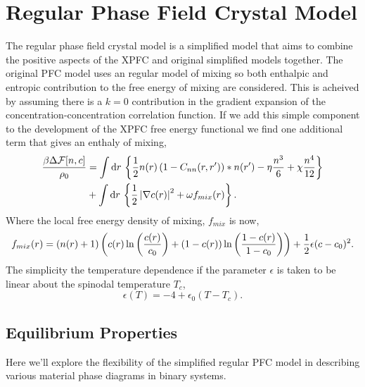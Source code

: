 \section{Regular Phase Field Crystal Model} %

The regular phase field crystal model is a simplified model that aims to combine 
the positive aspects of the XPFC and original simplified models together. The 
original PFC model uses an regular model of mixing so both enthalpic and entropic 
contribution to the free energy of mixing are considered. This is acheived by
assuming there is a $k=0$ contribution in the gradient expansion of the 
concentration-concentration correlation function. If we add this simple component
to the development of the XPFC free energy functional we find one additional term
that gives an enthaly of mixing,
%
\begin{align}
    \frac{\beta\Delta\mathcal{F}[n, c]}{\rho_0} &= \int \mathrm{d}r\, \left\lbrace
        \frac{1}{2} n(r) \left(1 - C_{nn}(r, r^\prime)\right) \ast n(r^\prime)
        - \eta \frac{n^3}{6} + \chi \frac{n^4}{12} \right\rbrace \\
        &+ \int \mathrm{d}r\,\left\lbrace
            \frac{1}{2}\left\vert \nabla c(r) \right\vert^2 + \omega f_{mix}(r)
            \right\rbrace. \nonumber
\end{align}
%
Where the local free energy density of mixing, $f_{mix}$ is now,
%
\begin{equation}
    f_{mix}(r) = \left(n(r) + 1\right)\left( 
            c(r)\ln\left(\frac{c(r)}{c_0}\right) + (1-c(r))\ln\left(\frac{1-c(r)}{1-c_0}\right) \right) + 
            \frac{1}{2} \epsilon (c - c_0)^2.
\end{equation}
%
The simplicity the temperature dependence if the parameter $\epsilon$ is taken to be
linear about the spinodal temperature $T_c$,
%
\begin{equation}
    \epsilon(T) = -4 + \epsilon_0(T - T_c).
\end{equation}

\subsection{Equilibrium Properties} %

Here we'll explore the flexibility of the simplified regular PFC model in
describing various material phase diagrams in binary systems.

